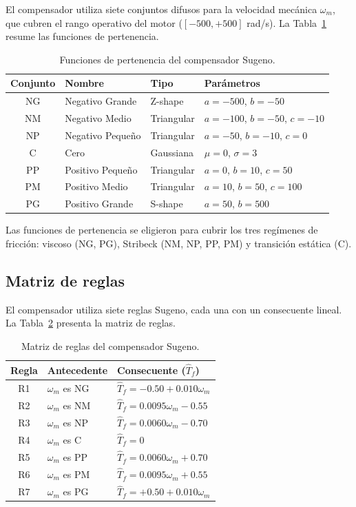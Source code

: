 El compensador utiliza siete conjuntos difusos para la velocidad mecánica $\omega_m$, que cubren el rango operativo del motor ($[-500, +500]$ rad/s). La Tabla~\ref{tab:cap5_mf} resume las funciones de pertenencia.

\begin{table}[H]
\centering
\caption{Funciones de pertenencia del compensador Sugeno.}
\label{tab:cap5_mf}
\small
\begin{tabular}{@{}clll@{}}
\toprule
\textbf{Conjunto} & \textbf{Nombre} & \textbf{Tipo} & \textbf{Parámetros} \\
\midrule
NG & Negativo Grande & Z-shape & $a=-500$, $b=-50$ \\
NM & Negativo Medio & Triangular & $a=-100$, $b=-50$, $c=-10$ \\
NP & Negativo Pequeño & Triangular & $a=-50$, $b=-10$, $c=0$ \\
C  & Cero & Gaussiana & $\mu=0$, $\sigma=3$ \\
PP & Positivo Pequeño & Triangular & $a=0$, $b=10$, $c=50$ \\
PM & Positivo Medio & Triangular & $a=10$, $b=50$, $c=100$ \\
PG & Positivo Grande & S-shape & $a=50$, $b=500$ \\
\bottomrule
\end{tabular}
\end{table}

Las funciones de pertenencia se eligieron para cubrir los tres regímenes de fricción: viscoso (NG, PG), Stribeck (NM, NP, PP, PM) y transición estática (C).

\subsection{Matriz de reglas}
\label{subsec:cap5_reglas}

El compensador utiliza siete reglas Sugeno, cada una con un consecuente lineal. La Tabla~\ref{tab:cap5_reglas} presenta la matriz de reglas.

\begin{table}[H]
\centering
\caption{Matriz de reglas del compensador Sugeno.}
\label{tab:cap5_reglas}
\small
\begin{tabular}{@{}cll@{}}
\toprule
\textbf{Regla} & \textbf{Antecedente} & \textbf{Consecuente ($\hat{T}_f$)} \\
\midrule
R1 & $\omega_m$ es NG & $\hat{T}_f = -0.50 + 0.010\omega_m$ \\
R2 & $\omega_m$ es NM & $\hat{T}_f = 0.0095\omega_m - 0.55$ \\
R3 & $\omega_m$ es NP & $\hat{T}_f = 0.0060\omega_m - 0.70$ \\
R4 & $\omega_m$ es C  & $\hat{T}_f = 0$ \\
R5 & $\omega_m$ es PP & $\hat{T}_f = 0.0060\omega_m + 0.70$ \\
R6 & $\omega_m$ es PM & $\hat{T}_f = 0.0095\omega_m + 0.55$ \\
R7 & $\omega_m$ es PG & $\hat{T}_f = +0.50 + 0.010\omega_m$ \\
\bottomrule
\end{tabular}
\end{table}

